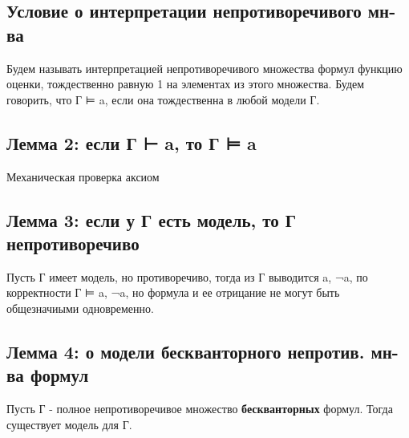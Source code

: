 \documentclass[11pt]{article}
\begin{document}
\subsection{Условие о интерпретации непротиворечивого мн-ва}
\label{sec-8-3}
Будем называть интерпретацией непротиворечивого множества
формул функцию оценки, тождественно равную 1 на элементах
из этого множества.
Будем говорить, что Г ⊨ a, если она тождественна в любой
модели Г.
\subsection{Лемма 2: если Г ⊢ a, то Г ⊨ a}
\label{sec-8-4}
Механическая проверка аксиом
\subsection{Лемма 3: если у Г есть модель, то Г непротиворечиво}
\label{sec-8-5}
Пусть Г имеет модель, но противоречиво, тогда из Г
выводится a, ¬a, по корректности Г ⊨ a, ¬a, но формула
и ее отрицание не могут быть общезначиыми одновременно.
\subsection{Лемма 4: о модели бескванторного непротив. мн-ва формул}
\label{sec-8-6}
Пусть Г - полное непротиворечивое множество
\textbf{бескванторных} формул. Тогда существует модель для Г.
\end{document}
